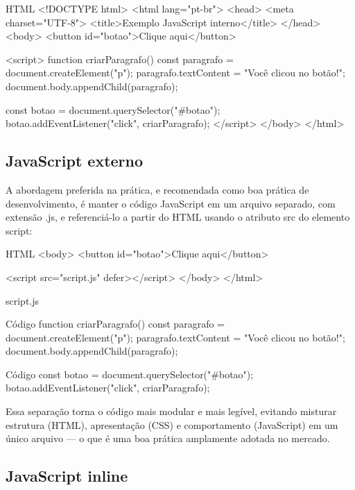 \begin{codebox}{HTML}
<!DOCTYPE html>
<html lang="pt-br">
<head>
  <meta charset="UTF-8">
  <title>Exemplo JavaScript interno</title>
</head>
<body>
  <button id="botao">Clique aqui</button>

     <script>
       function criarParagrafo() {
         const paragrafo = document.createElement("p");
         paragrafo.textContent = "Você clicou no botão!";
         document.body.appendChild(paragrafo);
       }

    const botao = document.querySelector("#botao");
    botao.addEventListener("click", criarParagrafo);
  </script>
</body>
</html>
\end{codebox}

\subsection{JavaScript externo}

A abordagem preferida na prática, e recomendada como boa prática de desenvolvimento, é manter o código JavaScript em um arquivo separado, com extensão .js, e referenciá-lo a partir do HTML usando o atributo src do elemento script:

\begin{codebox}{HTML}
<body>
  <button id="botao">Clique aqui</button>

  <script src="script.js" defer></script>
</body>
</html>
\end{codebox}

script.js

\begin{codebox}{Código}
function criarParagrafo() {
const paragrafo = document.createElement("p");
paragrafo.textContent = "Você clicou no botão!";
document.body.appendChild(paragrafo);
}
\end{codebox}

\begin{codebox}{Código}
const botao = document.querySelector("#botao");
botao.addEventListener("click", criarParagrafo);
\end{codebox}

Essa separação torna o código mais modular e mais legível, evitando misturar estrutura (HTML), apresentação (CSS) e comportamento (JavaScript) em um único arquivo — o que é uma boa prática amplamente adotada no mercado.

\subsection{JavaScript inline}

